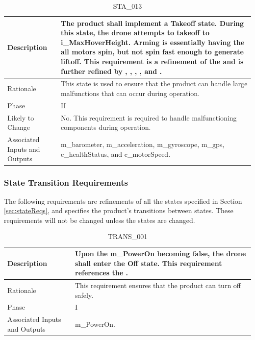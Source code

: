 \documentclass{article}
\begin{document}
\begin{table}[!h]
\begin{center}
\caption {STA\_013} 
\label{STA_013}
\begin{tabular}{ | m{3cm} | m{11cm} | }
\hline
Description & The product shall implement a Takeoff state. During this state, the drone attempts to takeoff to i\_MaxHoverHeight. Arming is essentially having the all motors spin, but not spin fast enough to generate liftoff. This requirement is a refinement of the \nameref{Takeoff State} and is further refined by \nameref{PERF_002}, \nameref{PERF_007}, \nameref{SAFE_001}, \nameref{SAFE_003}, and \nameref{USE_003}. \\
\hline
Rationale & This state is used to ensure that the product can handle large malfunctions that can occur during operation. \\
\hline
Phase & II \\
\hline
Likely to Change & No. This requirement is required to handle malfunctioning components during operation. \\
\hline
Associated Inputs and Outputs & m\_barometer, m\_acceleration, m\_gyroscope, m\_gps, c\_healthStatus, and c\_motorSpeed. \\
\hline
\end{tabular}
\end{center}
\end{table}

\subsubsection{State Transition Requirements}
\label{transReqs}
The following requirements are refinements of all the states specified in Section \ref{sec:stateReqs}, and specifies the product's transitions between states. These requirements will not be changed unless the states are changed.

\begin{table}[!h]
\begin{center}
\caption {TRANS\_001} 
\label{TRANS_001}
\begin{tabular}{ | m{3cm} | m{11cm} | }
\hline
Description & Upon the m\_PowerOn becoming false, the drone shall enter the Off state. This requirement references the \nameref{Off State}. \\
\hline
Rationale & This requirement ensures that the product can turn off safely. \\
\hline
Phase & I \\
\hline
Associated Inputs and Outputs & m\_PowerOn. \\
\hline
\end{tabular}
\end{center}
\end{table}
\end{document}
